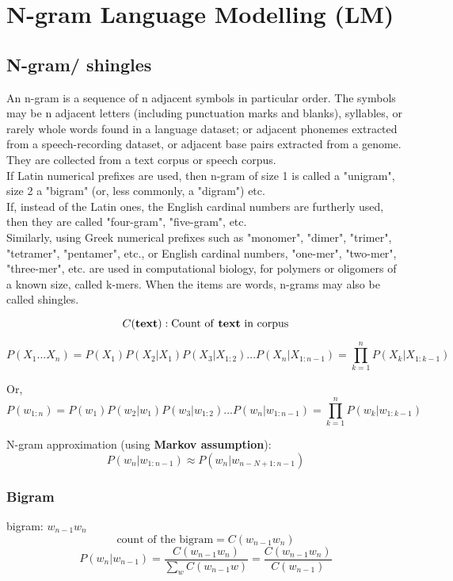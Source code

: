 \chapter{N-gram Language Modelling (LM)}

\section{N-gram/ shingles \cite{wiki-n-gram}}

An n-gram is a sequence of n adjacent symbols in particular order. The symbols may be n adjacent letters (including punctuation marks and blanks), syllables, or rarely whole words found in a language dataset; or adjacent phonemes extracted from a speech-recording dataset, or adjacent base pairs extracted from a genome. They are collected from a text corpus or speech corpus. \\
If Latin numerical prefixes are used, then n-gram of size 1 is called a "unigram", size 2 a "bigram" (or, less commonly, a "digram") etc. \\
If, instead of the Latin ones, the English cardinal numbers are furtherly used, then they are called "four-gram", "five-gram", etc. \\
Similarly, using Greek numerical prefixes such as "monomer", "dimer", "trimer", "tetramer", "pentamer", etc., or English cardinal numbers, "one-mer", "two-mer", "three-mer", etc. are used in computational biology, for polymers or oligomers of a known size, called k-mers. When the items are words, n-grams may also be called shingles.

\[
    C(\text{\textbf{text}}) : \text{Count of \textbf{text} in corpus}
\]

\[
    P(X_1...X_n) = P(X_1)P(X_2|X_1)P(X_3|X_{1:2})...P(X_n|X_{1:n-1}) = \prod_{k=1}^{n} P(X_k|X_{1:k-1}) 
\]

Or,
\[
    P(w_{1:n}) = P(w_1)P(w_2|w_1)P(w_3|w_{1:2})...P(w_n|w_{1:n-1}) = \prod_{k=1}^{n} P(w_k|w_{1:k-1}) 
\]

N-gram approximation (using \textbf{Markov assumption}):
\[
    P(w_n|w_{1:n-1}) \approx P(w_n|w_{n-N+1:n-1})
\]

\subsection{Bigram \cite{nlp-1}}
bigram: \(w_{n-1}w_n\)
\[
    \text{count of the bigram} = C(w_{n-1}w_n)
\]
\[
    P(w_n|w_{n-1}) = \displaystyle\frac{C(w_{n-1}w_n)}{\sum_w C(w_{n-1}w)} = \displaystyle\frac{C(w_{n-1}w_n)}{C(w_{n-1})} 
\]

